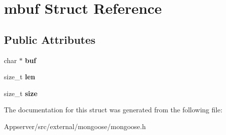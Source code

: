 \hypertarget{structmbuf}{}\section{mbuf Struct Reference}
\label{structmbuf}
\subsection*{Public Attributes}
\begin{DoxyCompactItemize}
\item 
char $\ast$ {\bfseries buf}\hypertarget{structmbuf_ae2a6e23a4997e9aea0908628db2b23d0}{}\label{structmbuf_ae2a6e23a4997e9aea0908628db2b23d0}

\item 
size\+\_\+t {\bfseries len}\hypertarget{structmbuf_a4da00860609dd46fe8b679d5e1deeac3}{}\label{structmbuf_a4da00860609dd46fe8b679d5e1deeac3}

\item 
size\+\_\+t {\bfseries size}\hypertarget{structmbuf_ae245d03a50c2891c1fb228093d842270}{}\label{structmbuf_ae245d03a50c2891c1fb228093d842270}

\end{DoxyCompactItemize}


The documentation for this struct was generated from the following file\+:\begin{DoxyCompactItemize}
\item 
Appserver/src/external/mongoose/mongoose.\+h\end{DoxyCompactItemize}
